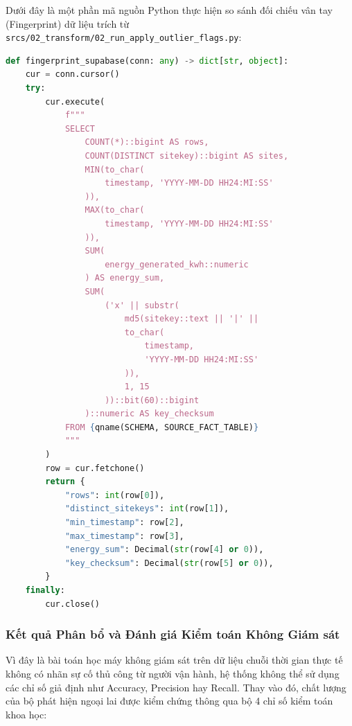 \documentclass[12pt, a4paper]{report}
\begin{document}
Dưới đây là một phần mã nguồn Python thực hiện so sánh đối chiếu vân tay (Fingerprint) dữ liệu trích từ \texttt{srcs/02\_transform/02\_run\_apply\_outlier\_flags.py}:

\begin{lstlisting}[language=Python, caption={Mã nguồn Python kiểm tra vân tay dữ liệu (Fingerprint) trước khi cập nhật}, label={lst:data_fingerprint}]
def fingerprint_supabase(conn: any) -> dict[str, object]:
    cur = conn.cursor()
    try:
        cur.execute(
            f"""
            SELECT
                COUNT(*)::bigint AS rows,
                COUNT(DISTINCT sitekey)::bigint AS sites,
                MIN(to_char(
                    timestamp, 'YYYY-MM-DD HH24:MI:SS'
                )),
                MAX(to_char(
                    timestamp, 'YYYY-MM-DD HH24:MI:SS'
                )),
                SUM(
                    energy_generated_kwh::numeric
                ) AS energy_sum,
                SUM(
                    ('x' || substr(
                        md5(sitekey::text || '|' || 
                        to_char(
                            timestamp, 
                            'YYYY-MM-DD HH24:MI:SS'
                        )),
                        1, 15
                    ))::bit(60)::bigint
                )::numeric AS key_checksum
            FROM {qname(SCHEMA, SOURCE_FACT_TABLE)}
            """
        )
        row = cur.fetchone()
        return {
            "rows": int(row[0]),
            "distinct_sitekeys": int(row[1]),
            "min_timestamp": row[2],
            "max_timestamp": row[3],
            "energy_sum": Decimal(str(row[4] or 0)),
            "key_checksum": Decimal(str(row[5] or 0)),
        }
    finally:
        cur.close()
\end{lstlisting}

\subsubsection{Kết quả Phân bổ và Đánh giá Kiểm toán Không Giám sát}
Vì đây là bài toán học máy không giám sát trên dữ liệu chuỗi thời gian thực tế không có nhãn sự cố thủ công từ người vận hành, hệ thống không thể sử dụng các chỉ số giả định như Accuracy, Precision hay Recall. Thay vào đó, chất lượng của bộ phát hiện ngoại lai được kiểm chứng thông qua bộ 4 chỉ số kiểm toán khoa học:
\end{document}
